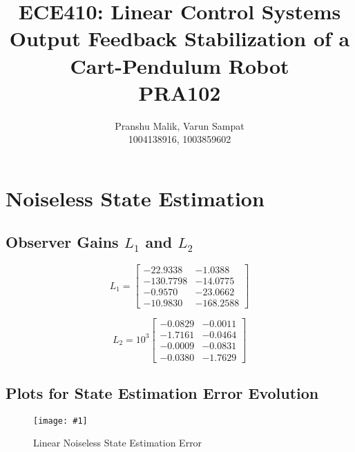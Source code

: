 \documentclass[10pt]{article}
\date{}
\newcommand{\shrinkimage}[1]{\texttt{[image: \#1]}}
\begin{document}
\title{\textbf{\Large{\textsc{ECE410:} Linear Control Systems}} \\ \Large{Output Feedback Stabilization of a Cart-Pendulum Robot} \\ \textbf{\small{PRA102}}\vspace{-0.3cm}}
\author{Pranshu Malik, Varun Sampat \\ \footnotesize{1004138916}, \footnotesize{1003859602}\vspace{-3cm}}

\maketitle

\section{Noiseless State Estimation}
\subsection{Observer Gains \texorpdfstring{$L_1$}{L1} and \texorpdfstring{$L_2$}{L2}}

\begin{equation*}
    L_1 = \begin{bmatrix}
    -22.9338 & -1.0388 \\
    -130.7798 & -14.0775 \\ 
    -0.9570 & -23.0662 \\ 
    -10.9830 & -168.2588
    \end{bmatrix}
\end{equation*}

\begin{equation*}
    L_2 = 10^{3} \begin{bmatrix}
    -0.0829  & -0.0011 \\
    -1.7161  & -0.0464 \\ 
    -0.0009  & -0.0831 \\ 
    -0.0380  & -1.7629
    \end{bmatrix}
\end{equation*}

\subsection{Plots for State Estimation Error Evolution}
\begin{figure}[b]
    \centering
    \shrinkimage{lab4/figs/lin_noiseless_state_est_error.pdf}
    \caption{Linear Noiseless State Estimation Error}
    \label{fig:lin_noiseless_state_est_error}
\end{figure}
\end{document}
